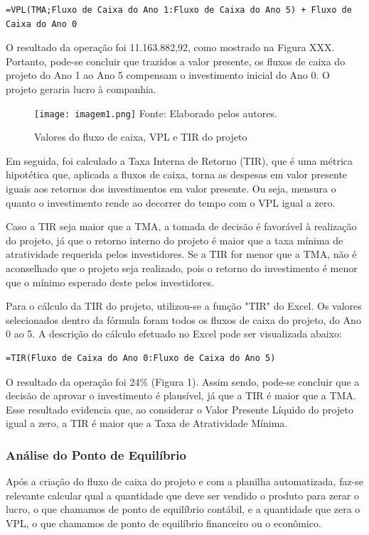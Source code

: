\documentclass[a4paper,12pt]{article}[abntex2]
\begin{document}
\begin{verbatim}
=VPL(TMA;Fluxo de Caixa do Ano 1:Fluxo de Caixa do Ano 5) + Fluxo de Caixa do Ano 0
\end{verbatim}

O resultado da operação foi 11.163.882,92, como mostrado na Figura XXX. Portanto, pode-se concluir que trazidos a valor presente, os fluxos de caixa do projeto do Ano 1 ao Ano 5 compensam o investimento inicial do Ano 0. O projeto geraria lucro à companhia.

\begin{figure}[h]
\centering
\caption{Valores do fluxo de caixa, VPL e TIR do projeto}
\texttt{[image: imagem1.png]}
\label{fig:my_label}
\footnotesize{Fonte: Elaborado pelos autores.}
\end{figure}
Em seguida, foi calculado a Taxa Interna de Retorno (TIR), que é uma métrica hipotética que, aplicada a fluxos de caixa, torna as despesas em valor presente iguais aos retornos dos investimentos em valor presente. Ou seja, mensura o quanto o investimento rende ao decorrer do tempo com o VPL igual a zero. 

Caso a TIR seja maior que a TMA, a tomada de decisão é favorável à realização do projeto, já que o retorno interno do projeto é maior que a taxa mínima de atratividade requerida pelos investidores. Se a TIR for menor que a TMA, não é aconselhado que o projeto seja realizado, pois o retorno do investimento é menor que o mínimo esperado deste pelos investidores. 

Para o cálculo da TIR do projeto, utilizou-se a função "TIR" do Excel. Os valores selecionados dentro da fórmula foram todos os fluxos de caixa do projeto, do Ano 0 ao 5. A descrição do cálculo efetuado no Excel pode ser visualizada abaixo:

\begin{verbatim}
=TIR(Fluxo de Caixa do Ano 0:Fluxo de Caixa do Ano 5)
\end{verbatim}

O resultado da operação foi 24\% (Figura 1). Assim sendo, pode-se concluir que a decisão de aprovar o investimento é plausível, já que a TIR é maior que a TMA. Esse resultado evidencia que, ao considerar o Valor Presente Líquido do projeto igual a zero, a TIR é maior que a Taxa de Atratividade Mínima.

\subsubsection{\textbf{Análise do Ponto de Equilíbrio}}
Após a criação do fluxo de caixa do projeto e com a planilha automatizada, faz-se relevante calcular qual a quantidade que deve ser vendido o produto para zerar o lucro, o que chamamos de ponto de equilíbrio contábil, e a quantidade que zera o VPL, o que chamamos de ponto de equilíbrio financeiro ou o econômico.
\end{document}
